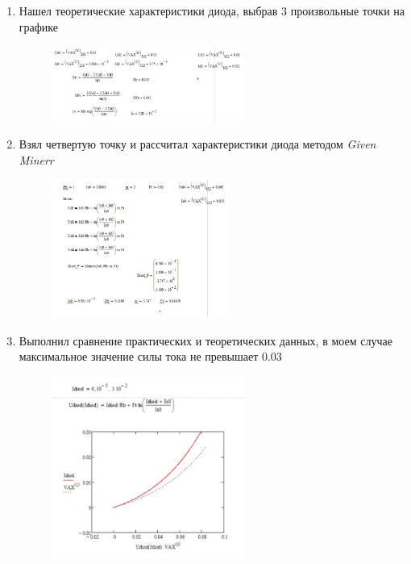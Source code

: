 \begin{enumerate}
\begin{figure}[H]
	\end{figure}
	\newpage
	\item Нашел теоретические характеристики диода, выбрав 3 произвольные точки на
	графике
	\begin{figure}[H]
		\centering
		\includegraphics[width=0.6\textwidth]{img/21.jpg}
	\end{figure}
	\item Взял четвертую точку и рассчитал характеристики диода методом \textit{Given
	Minerr}
	\begin{figure}[H]
		\centering
		\includegraphics[width=0.55\textwidth]{img/22.jpg}
	\end{figure}
	\newpage
	\item Выполнил сравнение практических и теоретических данных, в моем случае
	максимальное значение силы тока не превышает 0.03
	\begin{figure}[H]
		\centering
		\includegraphics[width=0.6\textwidth]{img/23.jpg}
	\end{figure}
\end{enumerate}
